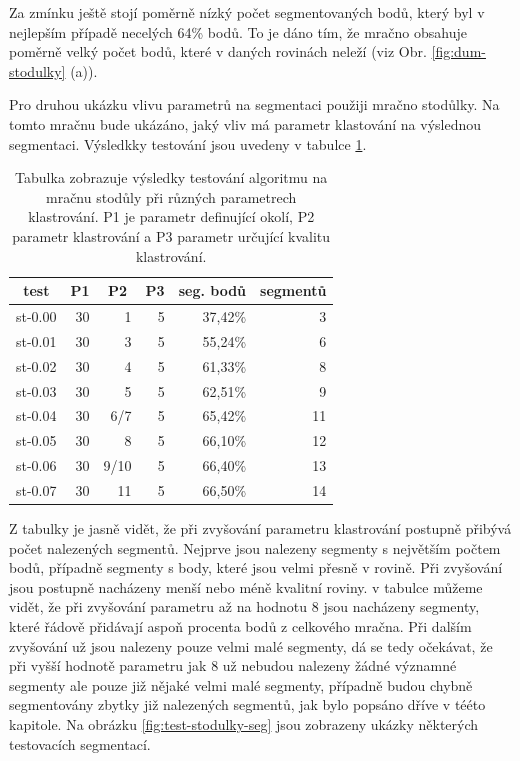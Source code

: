 \documentclass[11pt,twoside,a4paper]{book}
\begin{document}
Za zmínku ještě stojí poměrně nízký počet segmentovaných bodů, který byl v nejlepším případě necelých 64\% bodů. To je dáno tím, že mračno obsahuje poměrně velký počet bodů, které v daných rovinách neleží (viz Obr. \ref{fig:dum-stodulky} (a)).

Pro druhou ukázku vlivu parametrů na segmentaci použiji mračno stodůlky. Na tomto mračnu bude ukázáno, jaký vliv má parametr klastování na výslednou segmentaci. Výsledkky testování jsou uvedeny v tabulce \ref{table:test3-klastr}.

\begin{table}[ht]
\begin{center}
\begin{tabular}{|r|r|r|r|r|r|}
\hline
\multicolumn{1}{|c|}{\textbf{test}} & \multicolumn{1}{c|}{\textbf{P1}} & \multicolumn{1}{c|}{\textbf{P2}} & \multicolumn{1}{c|}{\textbf{P3}} & \multicolumn{1}{c|}{\textbf{seg. bodů}} & \multicolumn{1}{c|}{\textbf{segmentů}} \\ \hline
st-0.00 & 30 & 1 & 5 & 37,42\% & 3 \\ \hline
st-0.01 & 30 & 3 & 5 & 55,24\% & 6 \\ \hline
st-0.02 & 30 & 4 & 5 & 61,33\% & 8 \\ \hline
st-0.03 & 30 & 5 & 5 & 62,51\% & 9 \\ \hline
st-0.04 & 30 & 6/7 & 5 & 65,42\% & 11 \\ \hline
st-0.05 & 30 & 8 & 5 & 66,10\% & 12 \\ \hline
st-0.06 & 30 & 9/10 & 5 & 66,40\% & 13 \\ \hline
st-0.07 & 30 & 11 & 5 & 66,50\% & 14 \\ \hline
\end{tabular}
\caption{Tabulka zobrazuje výsledky testování algoritmu na mračnu stodůly při různých parametrech klastrování. P1 je parametr definující okolí, P2 parametr klastrování a P3 parametr určující kvalitu klastrování.} 
\label{table:test3-klastr}
\end{center}
\end{table}

Z tabulky je jasně vidět, že při zvyšování parametru klastrování postupně přibývá počet nalezených segmentů. Nejprve jsou nalezeny segmenty s největším počtem bodů, případně segmenty s body, které jsou velmi přesně v rovině. Při zvyšování jsou postupně nacházeny menší nebo méně kvalitní roviny. v tabulce můžeme vidět, že při zvyšování parametru až na hodnotu 8 jsou nacházeny segmenty, které řádově přidávají aspoň procenta bodů z celkového mračna. Při dalším zvyšování už jsou nalezeny pouze velmi malé segmenty, dá se tedy očekávat, že při vyšší hodnotě parametru jak 8 už nebudou nalezeny žádné významné segmenty ale pouze již nějaké velmi malé segmenty, případně budou chybně segmentovány zbytky již nalezených segmentů, jak bylo popsáno dříve v tééto kapitole. Na obrázku \ref{fig:test-stodulky-seg} jsou zobrazeny ukázky některých testovacích segmentací.
\end{document}
